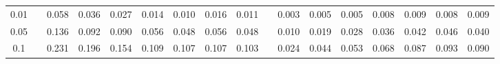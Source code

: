 % 
\begin{tabular}{ccccccccccccccccc}
  \hline
  \hline
0.01 &  & 0.058 & 0.036 & 0.027 & 0.014 & 0.010 & 0.016 & 0.011 &  & 0.003 & 0.005 & 0.005 & 0.008 & 0.009 & 0.008 & 0.009 \\ 
  0.05 &  & 0.136 & 0.092 & 0.090 & 0.056 & 0.048 & 0.056 & 0.048 &  & 0.010 & 0.019 & 0.028 & 0.036 & 0.042 & 0.046 & 0.040 \\ 
  0.1 &  & 0.231 & 0.196 & 0.154 & 0.109 & 0.107 & 0.107 & 0.103 &  & 0.024 & 0.044 & 0.053 & 0.068 & 0.087 & 0.093 & 0.090 \\ 
   \hline
\end{tabular}
